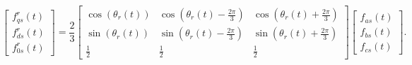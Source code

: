 \documentclass{article}
\begin{document}
\[
\begin{bmatrix}
    f_{qs}^r(t) \\
    f_{ds}^r(t) \\
    f_{0s}^r(t)
\end{bmatrix}
=
\frac{2}{3}
\begin{bmatrix}
    \cos(\theta_r(t)) & \cos\left(\theta_r(t) - \frac{2\pi}{3}\right) & \cos\left(\theta_r(t) + \frac{2\pi}{3}\right) \\
    \sin(\theta_r(t)) & \sin\left(\theta_r(t) - \frac{2\pi}{3}\right) & \sin\left(\theta_r(t) + \frac{2\pi}{3}\right) \\
    \frac{1}{2} & \frac{1}{2} & \frac{1}{2}
\end{bmatrix}
\begin{bmatrix}
    f_{as}(t) \\
    f_{bs}(t) \\
    f_{cs}(t)
\end{bmatrix}.
\]
\end{document}
